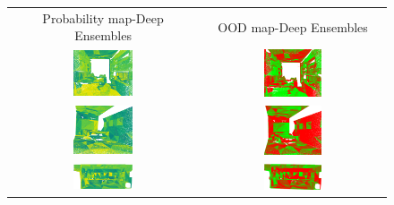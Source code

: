    \begin{figure}[h!]
        \centering
        \begin{tabular}{cc}
            Probability map-Deep Ensembles & OOD map-Deep Ensembles \\
            \includegraphics[width=0.33\textwidth, height=0.18\textheight]{images/ood_imgs/de_s3dis/ofc_3_de_prob.pdf}& 
            \includegraphics[width=0.33\textwidth, height=0.18\textheight]{images/ood_imgs/de_s3dis/de_prob_2.pdf}\\

            \includegraphics[width=0.33\textwidth, height=0.18\textheight]{images/ood_imgs/de_s3dis/cf1_de_prob.pdf}& 
            \includegraphics[width=0.33\textwidth, height=0.18\textheight]{images/ood_imgs/de_s3dis/de_prob_4.pdf}\\

            \includegraphics[width=0.33\textwidth, height=0.18\textheight]{images/ood_imgs/de_s3dis/pnt_1_de_prob.pdf}& 
            \includegraphics[width=0.33\textwidth, height=0.18\textheight]{images/ood_imgs/de_s3dis/de_prob_3.pdf}\\


\end{tabular}
\end{figure}
